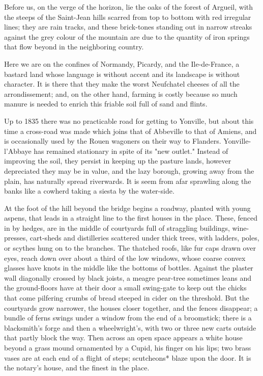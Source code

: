 \documentclass[11pt,twocolumn]{ltugboat}
\begin{document}
Before us, on the verge of the horizon, lie the oaks of the forest of
Argueil, with the steeps of the Saint-Jean hills scarred from top
to bottom with red irregular lines; they are rain tracks, and these
brick-tones standing out in narrow streaks against the grey colour of
the mountain are due to the quantity of iron springs that flow beyond in
the neighboring country.

Here we are on the confines of Normandy, Picardy, and the Ile-de-France,
a bastard land whose language is without accent and its landscape is
without character. It is there that they make the worst Neufchatel
cheeses of all the arrondissement; and, on the other hand, farming is
costly because so much manure is needed to enrich this friable soil full
of sand and flints.

Up to 1835 there was no practicable road for getting to Yonville, but
about this time a cross-road was made which joins that of Abbeville to
that of Amiens, and is occasionally used by the Rouen wagoners on their
way to Flanders. Yonville-l'Abbaye has remained stationary in spite of
its "new outlet." Instead of improving the soil, they persist in keeping
up the pasture lands, however depreciated they may be in value, and
the lazy borough, growing away from the plain, has naturally spread
riverwards. It is seem from afar sprawling along the banks like a
cowherd taking a siesta by the water-side.

At the foot of the hill beyond the bridge begins a roadway, planted with
young aspens, that leads in a straight line to the first houses in the
place. These, fenced in by hedges, are in the middle of courtyards
full of straggling buildings, wine-presses, cart-sheds and distilleries
scattered under thick trees, with ladders, poles, or scythes hung on to
the branches. The thatched roofs, like fur caps drawn over eyes, reach
down over about a third of the low windows, whose coarse convex glasses
have knots in the middle like the bottoms of bottles. Against the
plaster wall diagonally crossed by black joists, a meagre pear-tree
sometimes leans and the ground-floors have at their door a small
swing-gate to keep out the chicks that come pilfering crumbs of bread
steeped in cider on the threshold. But the courtyards grow narrower,
the houses closer together, and the fences disappear; a bundle of
ferns swings under a window from the end of a broomstick; there is a
blacksmith's forge and then a wheelwright's, with two or three new carts
outside that partly block the way. Then across an open space appears a
white house beyond a grass mound ornamented by a Cupid, his finger
on his lips; two brass vases are at each end of a flight of steps;
scutcheons* blaze upon the door. It is the notary's house, and the
finest in the place.
\end{document}
